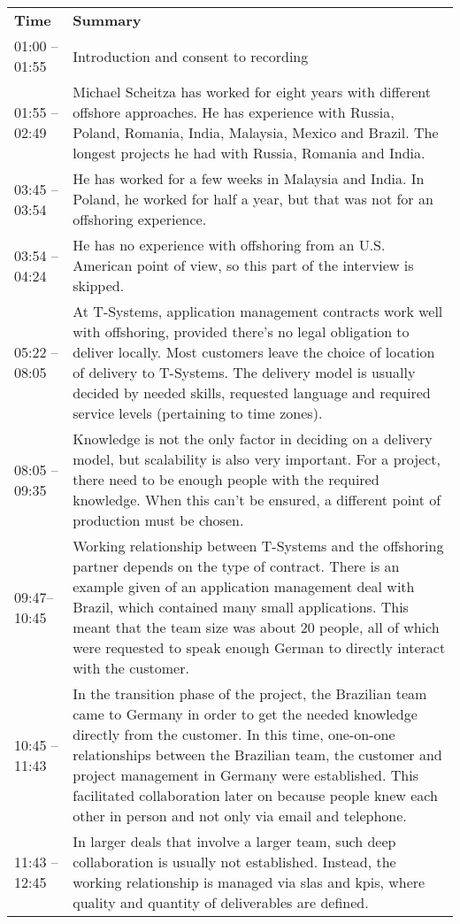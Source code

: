 \begin{appendix}
\begin{longtable}{l p{12.5cm}}
		\textbf{Time} & \textbf{Summary} \\ 
		01:00 -- 01:55& Introduction and consent to recording\\
		01:55 -- 02:49& Michael Scheitza has worked for eight years with different offshore approaches. He has experience with Russia, Poland, Romania, India, Malaysia, Mexico and Brazil. The longest projects he had with Russia, Romania and India.\\
		03:45 -- 03:54& He has worked for a few weeks in Malaysia and India. In Poland, he worked for half a year, but that was not for an offshoring experience.\\
		03:54 -- 04:24& He has no experience with offshoring from an U.S. American point of view, so this part of the interview is skipped.\\
		05:22 -- 08:05& At T-Systems, application management contracts work well with offshoring, provided there's no legal obligation to deliver locally. Most customers leave the choice of location of delivery to T-Systems. The delivery model is usually decided by needed skills, requested language and required service levels (pertaining to time zones).\\
		08:05 -- 09:35& Knowledge is not the only factor in deciding on a delivery model, but scalability is also very important. For a project, there need to be enough people with the required knowledge. When this can't be ensured, a different point of production must be chosen.\\
		09:47-- 10:45&Working relationship between T-Systems and the offshoring partner depends on the type of contract. There is an example given of an application management deal with Brazil, which contained many small applications. This meant that the team size was about 20 people, all of which were requested to speak enough German to directly interact with the customer.\\
		10:45 -- 11:43&In the transition phase of the project, the Brazilian team came to Germany in order to get the needed knowledge directly from the customer. In this time, one-on-one relationships between the Brazilian team, the customer and project management in Germany were established. This facilitated collaboration later on because people knew each other in person and not only via email and telephone.\\
		11:43 -- 12:45&In larger deals that involve a larger team, such deep collaboration is usually not established. Instead, the working relationship is managed via \glspl{sla} and \glspl{kpi}, where quality and quantity of deliverables are defined.\\

\end{longtable}
\end{appendix}
